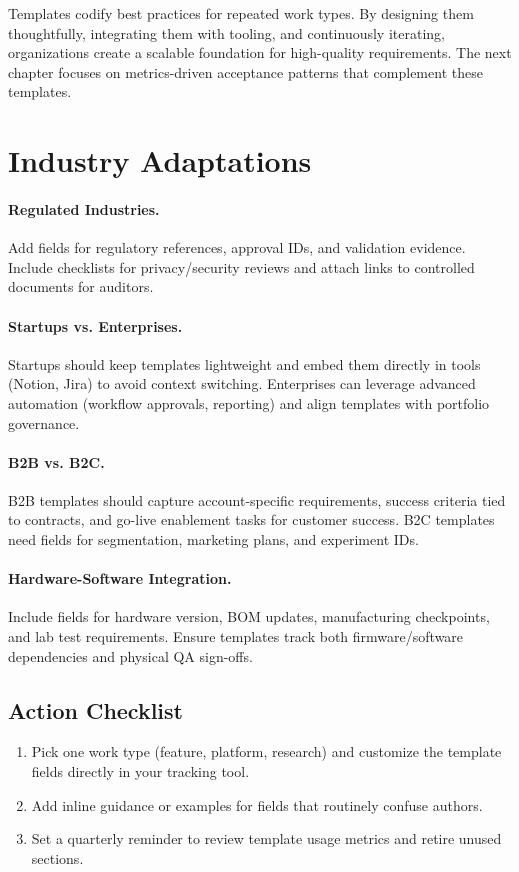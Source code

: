Templates codify best practices for repeated work types. By designing them thoughtfully, integrating them with tooling, and continuously iterating, organizations create a scalable foundation for high-quality requirements. The next chapter focuses on metrics-driven acceptance patterns that complement these templates.

\section{Industry Adaptations}
\label{sec:templates-industry}
\paragraph{Regulated Industries.} Add fields for regulatory references, approval IDs, and validation evidence. Include checklists for privacy/security reviews and attach links to controlled documents for auditors.

\paragraph{Startups vs. Enterprises.} Startups should keep templates lightweight and embed them directly in tools (Notion, Jira) to avoid context switching. Enterprises can leverage advanced automation (workflow approvals, reporting) and align templates with portfolio governance.

\paragraph{B2B vs. B2C.} B2B templates should capture account-specific requirements, success criteria tied to contracts, and go-live enablement tasks for customer success. B2C templates need fields for segmentation, marketing plans, and experiment IDs.

\paragraph{Hardware-Software Integration.} Include fields for hardware version, BOM updates, manufacturing checkpoints, and lab test requirements. Ensure templates track both firmware/software dependencies and physical QA sign-offs.

\subsection{Action Checklist}
\begin{enumerate}
    \item Pick one work type (feature, platform, research) and customize the template fields directly in your tracking tool.
    \item Add inline guidance or examples for fields that routinely confuse authors.
    \item Set a quarterly reminder to review template usage metrics and retire unused sections.
\end{enumerate}

